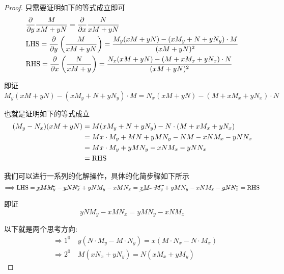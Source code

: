 \begin{proof}

只需要证明如下的等式成立即可
\begin{align*}
    &\frac{\partial }{\partial y}\frac{M}{xM+yN}=\frac{\partial }{\partial x}\frac{N}{xM+yN}\\
    & {\rm LHS} =\frac{\partial}{\partial y}\left(\frac{M}{x M+y N}\right)=\frac{M_y(x M+y N)-\left(x M_y+N+y N_y\right) \cdot M}{(x M+y N)^2}\\
    & {\rm RHS}=\frac{\partial}{\partial x}\left(\frac{N}{x M+y}\right)=\frac{N_x(x M+y N)-\left(M+x M_x+y N_x\right)\cdot N}{(x M+y N)^2}\\
\end{align*}

即证
\[
    M_y(x M+y N)-\left(x M_y+N+y N_y\right) \cdot M=N_x(x M+y N)-\left(M+x M_x+y N_x\right) \cdot N
\]

也就是证明如下的等式成立
\begin{align*}
    (M_y-N_x)(x M+y N)&=M(x M_y+N+y N_y)-N\cdot(M+x M_x+y N_x)\\
    &=M x \cdot M_y+{M N}+y M N_y-{N M}-x N M_x-y N N_x\\
    &=M x \cdot M_y+y M N_y-x N M_x-y N N_x\\
    & = {\rm RHS}
\end{align*}

我们可以进行一系列的化解操作，具体的化简步骤如下所示
\[
\Longrightarrow {\rm LHS}= \cancel {x M M_y} - \cancel{y N N_x} + y N M_y - x M N_x = \cancel{ x M \cdot M_y} + y M N_y-x N M_x- \cancel{y N N_x} = {\rm RHS}
\]

即证 
\[
    y N M_y - x M N_x = y M N_y - x N M_x
\]

以下就是两个思考方向:
\begin{align*}
    &\Rightarrow 1^0 \quad y(N\cdot M_y - M\cdot N_y) = x(M\cdot N_x - N\cdot M_x)\\
    &\Rightarrow 2^0 \quad M\left(x N_x+y N_y\right)=N\left(x M_x+y M_y\right)
\end{align*}

\end{proof}

